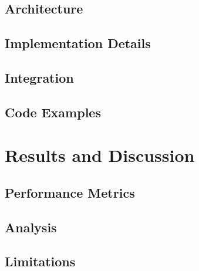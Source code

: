 \documentclass[12pt,oneside,a4paper]{article}
\begin{document}
\subsection{Architecture}

\subsection{Implementation Details}

\subsection{Integration}

\subsection{Code Examples}





\section{Results and Discussion}

\subsection{Performance Metrics}

\subsection{Analysis}

\subsection{Limitations}
\end{document}
